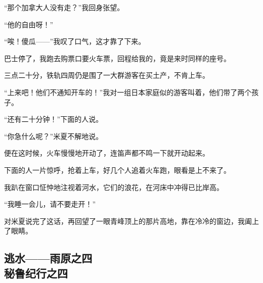\par “那个加拿大人没有走？”我回身张望。
\par “他的自由呀！”
\par “唉！傻瓜——”我叹了口气，这才靠了下来。
\par 巴士停了，我跑去购票口要火车票，回程给我的，竟是来时同样的座号。
\par 三点二十分，铁轨四周仍是围了一大群游客在买土产，不肯上车。
\par “上来吧！他们不通知开车的！”我对一组日本家庭似的游客叫着，他们带了两个孩子。
\par “还有二十分钟！”下面的人说。
\par “你急什么呢？”米夏不解地说。
\par 便在这时候，火车慢慢地开动了，连笛声都不鸣一下就开动起来。
\par 下面的人一片惊呼，抢着上车，好几个人追着火车跑，眼看是上不来了。
\par 我趴在窗口怔忡地注视着河水，它们的浪花，在河床中冲得已比岸高。
\par “我睡一会儿，请不要走开！”
\par 对米夏说完了这话，再回望了一眼青峰顶上的那片高地，靠在冷冷的窗边，我阖上了眼睛。



\subsection{逃水——雨原之四\\\small{秘鲁纪行之四}}

